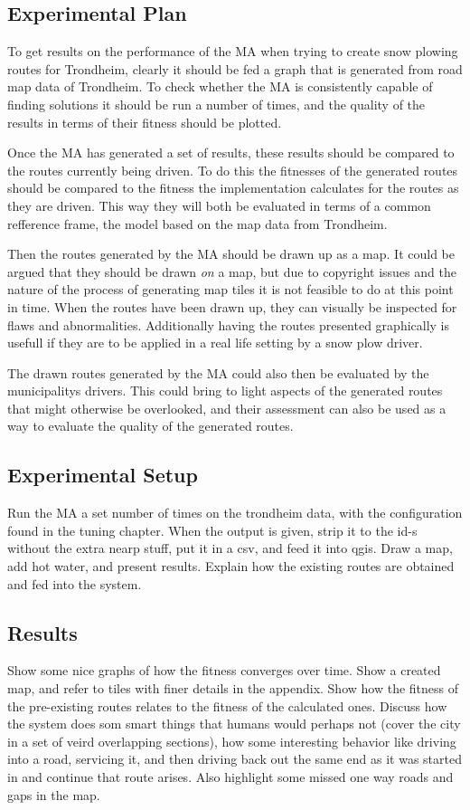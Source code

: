 \subsection{Experimental Plan}

To get results on the performance of the MA when trying to create snow plowing routes for Trondheim, clearly it should be fed a graph that is generated from road map data of Trondheim. To check whether the MA is consistently capable of finding solutions it should be run a number of times, and the quality of the results in terms of their fitness should be plotted.

Once the MA has generated a set of results, these results should be compared to the routes currently being driven. To do this the fitnesses of the generated routes should be compared to the fitness the implementation calculates for the routes as they are driven. This way they will both be evaluated in terms of a common refference frame, the model based on the map data from Trondheim.

Then the routes generated by the MA should be drawn up as a map. It could be argued that they should be drawn \emph{on} a map, but due to copyright issues and the nature of the process of generating map tiles it is not feasible to do at this point in time. When the routes have been drawn up, they can visually be inspected for flaws and abnormalities. Additionally having the routes presented graphically is usefull if they are to be applied in a real life setting by a snow plow driver.

The drawn routes generated by the MA could also then be evaluated by the municipalitys drivers. This could bring to light aspects of the generated routes that might otherwise be overlooked, and their assessment can also be used as a way to evaluate the quality of the generated routes.

\subsection{Experimental Setup}
Run the MA a set number of times on the trondheim data, with the configuration found in the tuning chapter. When the output is given, strip it to the id-s without the extra nearp stuff, put it in a csv, and feed it into qgis. Draw a map, add hot water, and present results.
Explain how the existing routes are obtained and fed into the system.

\subsection{Results}
Show some nice graphs of how the fitness converges over time.
Show a created map, and refer to tiles with finer details in the appendix.
Show how the fitness of the pre-existing routes relates to the fitness of the calculated ones.
Discuss how the system does som smart things that humans would perhaps not (cover the city in a set of veird overlapping sections), how some interesting behavior like driving into a road, servicing it, and then driving back out the same end as it was started in and continue that route arises. Also highlight some missed one way roads and gaps in the map.


\cleardoublepage